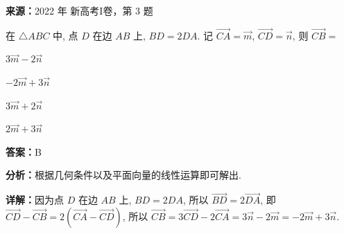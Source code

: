 \begin{question}[points=5]
\textbf{来源：}2022 年 新高考I卷，第 3 题\par
在 $\triangle ABC$ 中, 点 $D$ 在边 $AB$ 上, $BD = 2DA$. 记 $\overrightarrow{CA} = \vec{m}$, $\overrightarrow{CD} = \vec{n}$, 则 $\overrightarrow{CB} =$
\begin{choices}
  \item $3\vec{m} - 2\vec{n}$
  \item $-2\vec{m} + 3\vec{n}$
  \item $3\vec{m} + 2\vec{n}$
  \item $2\vec{m} + 3\vec{n}$
\end{choices}
\begin{solution}
\textbf{答案：}B

\textbf{分析：}根据几何条件以及平面向量的线性运算即可解出.

\textbf{详解：}因为点 $D$ 在边 $AB$ 上, $BD = 2DA$, 所以 $\overrightarrow{BD} = 2\overrightarrow{DA}$, 即 $\overrightarrow{CD} - \overrightarrow{CB} = 2(\overrightarrow{CA} - \overrightarrow{CD})$, 所以 $\overrightarrow{CB} = 3\overrightarrow{CD} - 2\overrightarrow{CA} = 3\vec{n} - 2\vec{m} = -2\vec{m} + 3\vec{n}$.
\end{solution}
\end{question}

